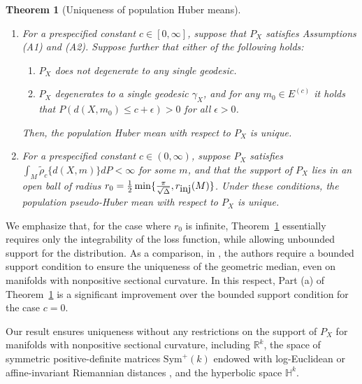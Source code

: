 \documentclass[preprint]{imsart}
\newcommand{\bbH}{\mathbb{H}}
\newcommand{\bbR}{\mathbb{R}}
\theoremstyle{plain}
\newtheorem{theorem}{Theorem}
\theoremstyle{remark}
\begin{document}
 
\begin{theorem}[Uniqueness of population Huber means]\label{thm:unique:pop} 
\begin{enumerate}
     \item[(a)]
For a prespecified constant $c \in [0,\infty]$, suppose that $P_{X}$ satisfies Assumptions (A1) and (A2). 
  Suppose further that  either of the following holds: 
          \begin{enumerate}
              \item[(i)] $P_X$ does not degenerate to any single geodesic.
              \item[(ii)] $P_X$ degenerates to a single geodesic $\gamma_X$,  and  for any $m_0 \in E^{(c)}$ it holds that $P(d(X, m_0) \le c+\epsilon ) > 0$ for all $\epsilon > 0$.
          \end{enumerate} 
Then, the population Huber mean with respect to $P_{X}$ is unique. 
     \item[(b)]
For a prespecified constant $c \in (0,\infty)$, suppose $P_{X}$ satisfies $\int_M \tilde{\rho}_{c} \{d(X,m)\} dP < \infty$ for some $m$, and that the support of $P_X$ lies in an open ball of radius $r_0 = \frac{1}{2}\min\{\frac{\pi}{\sqrt{\Delta}}, r_{\mbox{\tiny inj}}(M) \}$. Under these conditions, the population pseudo-Huber mean with respect to $P_{X}$ is unique.
\end{enumerate}
\end{theorem}  

We emphasize that, for the case where $r_0$ is infinite, Theorem~\ref{thm:unique:pop} essentially requires only the integrability of the loss function, while allowing unbounded support for the distribution.  
As a comparison, in \cite{yang2010riemannian,afsari2011riemannian}, the authors require a bounded support condition to ensure the uniqueness of the geometric median, even on manifolds with nonpositive sectional curvature. In this respect, %
Part (a) of Theorem~\ref{thm:unique:pop} is a significant improvement over the bounded support condition for the case $c = 0$.

Our result ensures uniqueness without any restrictions on the support of $P_X$ for manifolds with nonpositive sectional curvature, including $\bbR^{k}$, the space of symmetric positive-definite matrices $\mbox{Sym}^{+}(k)$ endowed with log-Euclidean or affine-invariant Riemannian distances \citep{pennec2006riemannian}, and the hyperbolic space $\bbH^{k}$. 

  
\end{document}
